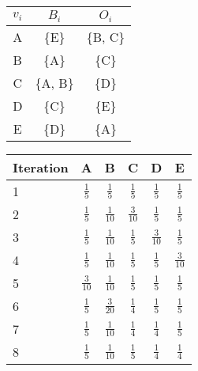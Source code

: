 \documentclass[ngerman]{scrartcl}
\begin{document}
\begin{enumerate}[label=\alph*)]
\begin{enumerate}
        \begin{tabular}{|*{3}{c|}}
          \hline
          $v_i$ & $B_i$ & $O_i$    \\
          \hline
          A & \{E\}     & \{B, C\} \\
          \hline
          B & \{A\}     & \{C\}    \\
          \hline
          C & \{A, B\}  & \{D\}    \\
          \hline
          D & \{C\}     & \{E\}    \\
          \hline
          E & \{D\}     & \{A\}    \\
          \hline
        \end{tabular}

        \begin{doublespacing}
          \begin{tabular}{|l|*{5}{c|}}
            \hline
            Iteration & A & B & C & D & E \\
            \hline
            1 & $\frac{1}{5}$ & $\frac{1}{5}$ & $\frac{1}{5}$ & $\frac{1}{5}$ & $\frac{1}{5}$ \\
            \hline
            2 & $\frac{1}{5}$ & $\frac{1}{10}$ & $\frac{3}{10}$ & $\frac{1}{5}$ & $\frac{1}{5}$ \\
            \hline
            3 & $\frac{1}{5}$ & $\frac{1}{10}$ & $\frac{1}{5}$ & $\frac{3}{10}$ & $\frac{1}{5}$ \\
            \hline
            4 & $\frac{1}{5}$ & $\frac{1}{10}$ & $\frac{1}{5}$ & $\frac{1}{5}$ & $\frac{3}{10}$ \\
            \hline
            5 & $\frac{3}{10}$ & $\frac{1}{10}$ & $\frac{1}{5}$ & $\frac{1}{5}$ & $\frac{1}{5}$ \\
            \hline
            6 & $\frac{1}{5}$ & $\frac{3}{20}$ & $\frac{1}{4}$ & $\frac{1}{5}$ & $\frac{1}{5}$ \\
            \hline
            7 & $\frac{1}{5}$ & $\frac{1}{10}$ & $\frac{1}{4}$ & $\frac{1}{4}$ & $\frac{1}{5}$ \\
            \hline
            8 & $\frac{1}{5}$ & $\frac{1}{10}$ & $\frac{1}{5}$ & $\frac{1}{4}$ & $\frac{1}{4}$ \\
            \hline
          \end{tabular}
        \end{doublespacing}

      \end{enumerate}


  \end{enumerate}
\end{document}
